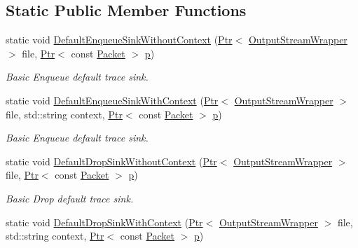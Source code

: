 \subsection*{Static Public Member Functions}
\begin{DoxyCompactItemize}
\item 
static void \hyperlink{classns3_1_1AsciiTraceHelper_ad4ae3d42d9e6764ac5a3aaae5712144b}{Default\+Enqueue\+Sink\+Without\+Context} (\hyperlink{classns3_1_1Ptr}{Ptr}$<$ \hyperlink{classns3_1_1OutputStreamWrapper}{Output\+Stream\+Wrapper} $>$ file, \hyperlink{classns3_1_1Ptr}{Ptr}$<$ const \hyperlink{classns3_1_1Packet}{Packet} $>$ \hyperlink{lte__link__budget__x2__handover__measures_8m_ac9de518908a968428863f829398a4e62}{p})
\begin{DoxyCompactList}\small\item\em Basic Enqueue default trace sink. \end{DoxyCompactList}\item 
static void \hyperlink{classns3_1_1AsciiTraceHelper_a9b6db67e12e13496f736f9895f211688}{Default\+Enqueue\+Sink\+With\+Context} (\hyperlink{classns3_1_1Ptr}{Ptr}$<$ \hyperlink{classns3_1_1OutputStreamWrapper}{Output\+Stream\+Wrapper} $>$ file, std\+::string context, \hyperlink{classns3_1_1Ptr}{Ptr}$<$ const \hyperlink{classns3_1_1Packet}{Packet} $>$ \hyperlink{lte__link__budget__x2__handover__measures_8m_ac9de518908a968428863f829398a4e62}{p})
\begin{DoxyCompactList}\small\item\em Basic Enqueue default trace sink. \end{DoxyCompactList}\item 
static void \hyperlink{classns3_1_1AsciiTraceHelper_ab4af2bbcf4e503b70da26d8850b20b67}{Default\+Drop\+Sink\+Without\+Context} (\hyperlink{classns3_1_1Ptr}{Ptr}$<$ \hyperlink{classns3_1_1OutputStreamWrapper}{Output\+Stream\+Wrapper} $>$ file, \hyperlink{classns3_1_1Ptr}{Ptr}$<$ const \hyperlink{classns3_1_1Packet}{Packet} $>$ \hyperlink{lte__link__budget__x2__handover__measures_8m_ac9de518908a968428863f829398a4e62}{p})
\begin{DoxyCompactList}\small\item\em Basic Drop default trace sink. \end{DoxyCompactList}\item 
static void \hyperlink{classns3_1_1AsciiTraceHelper_a23bfa6926e104f782e1a8c87e54cc7e8}{Default\+Drop\+Sink\+With\+Context} (\hyperlink{classns3_1_1Ptr}{Ptr}$<$ \hyperlink{classns3_1_1OutputStreamWrapper}{Output\+Stream\+Wrapper} $>$ file, std\+::string context, \hyperlink{classns3_1_1Ptr}{Ptr}$<$ const \hyperlink{classns3_1_1Packet}{Packet} $>$ \hyperlink{lte__link__budget__x2__handover__measures_8m_ac9de518908a968428863f829398a4e62}{p})

\end{DoxyCompactItemize}
